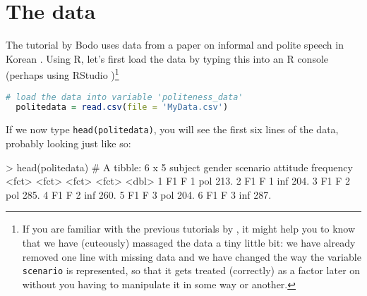 \documentclass[fleqn,reqno,12pt]{article}
\newcommand{\ri}[1]{\lstinline{#1}}  %
\begin{document}
\section{The data}

The tutorial by Bodo \citet{Winter2013:Linear-models-a} uses data from a paper on informal and polite speech in Korean \citep{WinterGrawunder2012:The-Phonetic-Pr}. Using R, let's first load the data by typing this into an R console (perhaps using RStudio )\footnote{If you are familiar with the previous tutorials by \citet{Winter2013:Linear-models-a}, it might help you to know that we have (cuteously) massaged the data a tiny little bit: we have already removed one line with missing data and we have changed the way the variable \texttt{scenario} is represented, so that it gets treated (correctly) as a factor later on without you having to manipulate it in some way or another.}

\begin{lstlisting}[language=R]
  # load the data into variable 'politeness_data'
  politedata = read.csv(file = 'MyData.csv')     
\end{lstlisting}

If we now type \ri{head(politedata)}, you will see the first six lines of the data, probably looking just like so:

\medskip


\begin{rc}
> head(politedata)
# A tibble: 6 x 5
  subject gender scenario attitude frequency
  <fct>   <fct>  <fct>    <fct>        <dbl>
1 F1      F      1        pol           213.
2 F1      F      1        inf           204.
3 F1      F      2        pol           285.
4 F1      F      2        inf           260.
5 F1      F      3        pol           204.
6 F1      F      3        inf           287.
\end{rc}


\printbibliography[heading=bibintoc]
\end{document}
